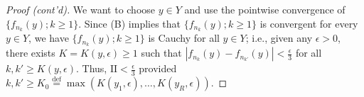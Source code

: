 \documentclass[letterpaper, reqno,11pt]{article}
\begin{document}
\begin{proof}[Proof (cont'd)]
  We want to choose $y \in Y$ and use the pointwise convergence of $\{ f_{n_k}(y) ; k \geq 1 \}$. Since (B) implies that $\{ f_{n_k}(y) ; k \geq 1 \}$ is convergent for every $y \in Y$, we have $\{ f_{n_k}(y) ; k \geq 1 \}$ is Cauchy for all $y \in Y$; i.e., given any $\epsilon > 0$, there exists $K = K(y, \epsilon) \geq 1$ such that $|f_{n_k}(y) - f_{n_{k'}}(y)| < \frac{\epsilon}{3}$ for all $k, k' \geq K(y, \epsilon)$. Thus, $\text{II} < \frac{\epsilon}{3}$ provided $k, k' \geq K_0 \stackrel{\text{def}}{=} \max(K(y_1, \epsilon), \ldots, K(y_R, \epsilon))$.
\end{proof}
\end{document}

